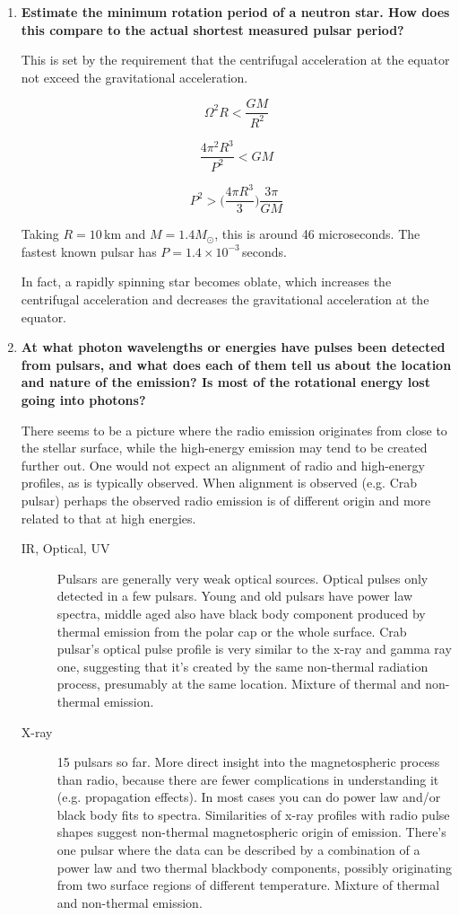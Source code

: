 \documentclass[a4paper]{article}
\begin{document}
\begin{enumerate}
\item \textbf{Estimate the minimum rotation period of a neutron star. How does this compare to the
actual shortest measured pulsar period?}

This is set by the requirement that the centrifugal acceleration at the equator not exceed the gravitational acceleration.

$$ \Omega^2 R < {\frac{G M} {R^2}} $$

$$ {\frac{4 \pi^2 R^3} {P^2}} < GM $$

$$ P^2 > \biggl( { \frac{4 \pi R^3}{3}} \biggr) {\frac{3 \pi}{GM}} $$

Taking $ R = 10\,$km and $M = 1.4 M_\odot$, this is around 46 microseconds. The fastest known pulsar has $P = 1.4 \times 10^{-3}\,$seconds.

In fact, a rapidly spinning star becomes oblate, which increases the centrifugal acceleration and decreases the gravitational acceleration at the equator.

\item \textbf{At what photon wavelengths or energies have pulses been detected from pulsars, and what does each of them tell us about the location and nature of the emission? Is most of the rotational energy lost going into photons?}

There seems to be a picture where the radio emission originates from close to the stellar surface, while the high-energy emission may tend to be created further out. One would not expect an alignment of radio and high-energy profiles, as is typically observed. When alignment is observed (e.g. Crab pulsar) perhaps the observed radio emission is of different origin and more related to that at high energies. 

\begin{description}

\item[IR, Optical, UV] Pulsars are generally very weak optical sources. Optical pulses only detected in a few pulsars. Young and old pulsars have power law spectra, middle aged also have black body component produced by thermal emission from the polar cap or the whole surface. Crab pulsar's optical pulse profile is very similar to the x-ray and gamma ray one, suggesting that it's created by the same non-thermal radiation process, presumably at the same location. Mixture of thermal and non-thermal emission. 

\item[X-ray] 15 pulsars so far. More direct insight into the magnetospheric process than radio, because there are fewer complications in understanding it (e.g. propagation effects). In most cases you can do power law and/or black body fits to spectra. Similarities of x-ray profiles with radio pulse shapes suggest non-thermal magnetospheric origin of emission. There's one pulsar where the data can be described by a combination of a power law and two thermal blackbody components, possibly originating from two surface regions of different temperature. Mixture of thermal and non-thermal emission. 


\end{description}
\end{enumerate}
\end{document}
